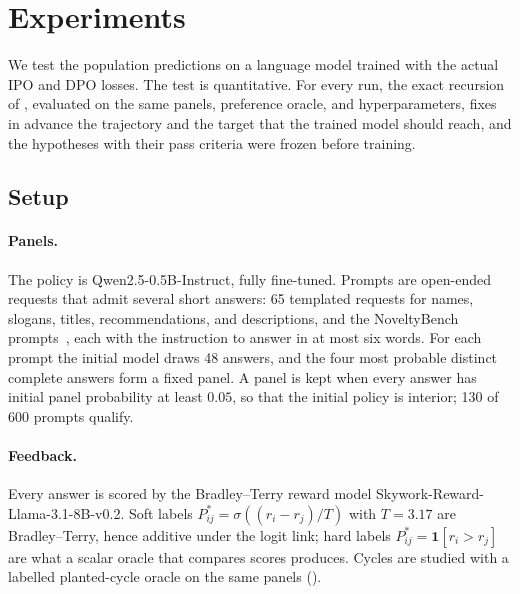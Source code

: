 \section{Experiments}
\label{sec:experiments}

We test the population predictions on a language model trained with the actual IPO and DPO losses. The test is quantitative. For every run, the exact recursion of , evaluated on the same panels, preference oracle, and hyperparameters, fixes in advance the trajectory and the target that the trained model should reach, and the hypotheses with their pass criteria were frozen before training.

\subsection{Setup}
\paragraph{Panels.} The policy is Qwen2.5-0.5B-Instruct, fully fine-tuned. Prompts are open-ended requests that admit several short answers: 65 templated requests for names, slogans, titles, recommendations, and descriptions, and the NoveltyBench prompts~\citep{zhang2025noveltybench}, each with the instruction to answer in at most six words. For each prompt the initial model draws 48 answers, and the four most probable distinct complete answers form a fixed panel. A panel is kept when every answer has initial panel probability at least $0.05$, so that the initial policy is interior; 130 of 600 prompts qualify.

\paragraph{Feedback.} Every answer is scored by the Bradley--Terry reward model Skywork-Reward-Llama-3.1-8B-v0.2. Soft labels $P^*_{ij}=\sigma((r_i-r_j)/T)$ with $T=3.17$ are Bradley--Terry, hence additive under the logit link; hard labels $P^*_{ij}=\mathbf 1[r_i>r_j]$ are what a scalar oracle that compares scores produces. Cycles are studied with a labelled planted-cycle oracle on the same panels ().

